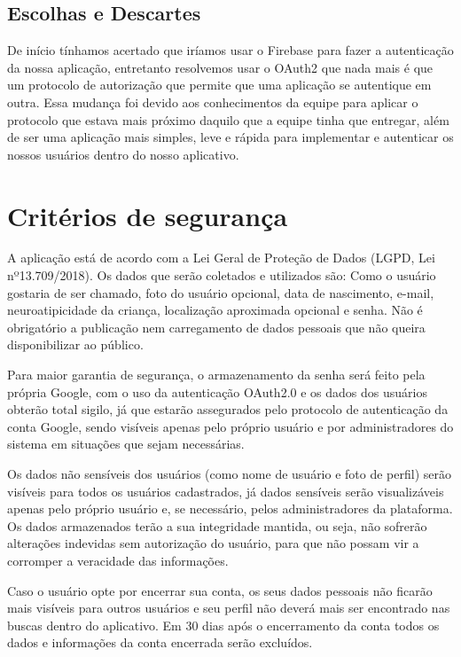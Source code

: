 \subsection{Escolhas e Descartes}

De início tínhamos acertado que iríamos usar o Firebase para fazer a autenticação da nossa aplicação, entretanto resolvemos usar o OAuth2 que nada mais é que um protocolo de autorização que permite que uma aplicação se autentique em outra. Essa mudança foi devido aos conhecimentos da equipe para aplicar o protocolo que estava mais próximo daquilo que a equipe tinha que entregar, além de ser uma aplicação mais simples, leve e rápida para implementar e autenticar os nossos usuários dentro do nosso aplicativo. 

\section{Critérios de segurança}


A aplicação está de acordo com a Lei Geral de Proteção de Dados (LGPD, Lei nº13.709/2018). Os dados que serão coletados e utilizados são: Como o usuário gostaria de ser chamado, foto do usuário opcional, data de nascimento, e-mail, neuroatipicidade da criança, localização aproximada opcional e senha. Não é obrigatório a publicação nem carregamento de dados pessoais que não queira disponibilizar ao público. 

Para maior garantia de segurança, o armazenamento da senha será feito pela própria Google, com o uso da autenticação OAuth2.0 e os dados dos usuários obterão total sigilo, já que estarão assegurados pelo protocolo de autenticação da conta Google, sendo visíveis apenas pelo próprio usuário e por administradores do sistema em situações que sejam necessárias. 

Os dados não sensíveis dos usuários (como nome de usuário e foto de perfil) serão visíveis para todos os usuários cadastrados, já dados sensíveis serão visualizáveis apenas pelo próprio usuário e, se necessário, pelos administradores da plataforma. Os dados armazenados terão a sua integridade mantida, ou seja, não sofrerão alterações indevidas sem autorização do usuário, para que não possam vir a corromper a veracidade das informações. 

Caso o usuário opte por encerrar sua conta, os seus dados pessoais não ficarão mais visíveis para outros usuários e seu perfil não deverá mais ser encontrado nas buscas dentro do aplicativo. Em 30 dias após o encerramento da conta todos os dados e informações da conta encerrada serão excluídos. 


